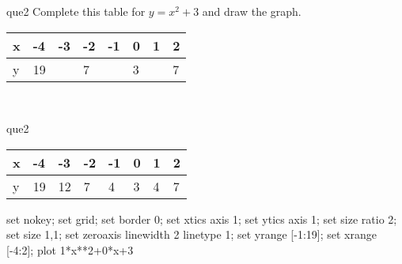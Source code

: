 \documentclass[13.5pt, varwidth=true]{beamer}
\begin{document}
\begin{frame}[shrink=19,fragile]
	\begin{beamercolorbox}[rounded=true, left, shadow=true,wd=14.8cm]{que2}
		 Complete this table for $y = x^{2} + 3$ and draw the graph. \\[0.3cm] \renewcommand{\arraystretch}{1.2}\begin{tabular}{|C|C|C|C|C|C|C|C|} \hline x & -4 & -3 & -2 & -1 & 0 & 1 & 2 \\ \hline y & 19 &  & 7 &  & 3 &  & 7\\ \hline \end{tabular}\\[0.3cm]
	\end{beamercolorbox}
\end{frame}
\begin{frame}[shrink=19,fragile]
	\begin{beamercolorbox}[rounded=true, left, shadow=true,wd=14.8cm]{que2}
		\renewcommand{\arraystretch}{1.2}\begin{tabular}{|C|C|C|C|C|C|C|C|} \hline x & -4 & -3 & -2 & -1 & 0 & 1 & 2 \\ \hline y & 19 & 12 & 7 & 4 & 3 & 4 & 7\\ \hline \end{tabular}\begin{gnuplot}[terminal=pdf] set nokey; set grid; set border 0; set xtics axis 1; set ytics axis 1; set size ratio 2; set size 1,1; set zeroaxis linewidth 2 linetype 1; set yrange [-1:19]; set xrange [-4:2]; plot 1*x**2+0*x+3 \end{gnuplot}
	\end{beamercolorbox}
\end{frame}
\end{document}
